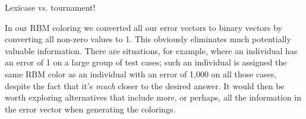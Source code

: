 \documentclass{sig-alternate}
\begin{document}
Lexicase vs. tournament!

In our RBM coloring we converted all our error vectors to binary vectors by
converting all non-zero values to 1. This obviously eliminates much potentially
valuable information. There are situations, for example, where an individual has
an error of 1 on a large group of test cases; such an individual is assigned
the same RBM color as an individual with an error of 1,000 on all those cases,
despite the fact that it's \emph{much} closer to the desired answer.
It would then be worth exploring alternatives that include
more, or perhaps, all the information in the error vector when generating the
colorings.





\end{document}
